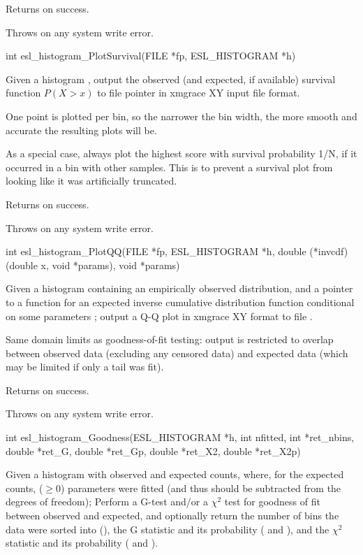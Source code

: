 \begin{sreapi}
Returns  on success.

Throws  on any system write error.


\hypertarget{func:esl_histogram_PlotSurvival()}
{\item[int esl\_histogram\_PlotSurvival(FILE *fp, ESL\_HISTOGRAM *h)]}

Given a histogram , output the observed (and
expected, if available) survival function $P(X>x)$
to file pointer  in xmgrace XY input file format.

One point is plotted per bin, so the narrower the
bin width, the more smooth and accurate the resulting
plots will be.

As a special case, always plot the highest score with
survival probability 1/N, if it occurred in a bin with
other samples. This is to prevent a survival plot from
looking like it was artificially truncated.

Returns  on success.

Throws  on any system write error.


\hypertarget{func:esl_histogram_PlotQQ()}
{\item[int esl\_histogram\_PlotQQ(FILE *fp, ESL\_HISTOGRAM *h, 
		     double (*invcdf)(double x, void *params), void *params)]}

Given a histogram  containing an empirically observed
distribution, and a pointer to a function 
for an expected inverse cumulative distribution
function conditional on some parameters ;
output a Q-Q plot in xmgrace XY format to file .

Same domain limits as goodness-of-fit testing: output
is restricted to overlap between observed data (excluding
any censored data) and expected data (which may be limited
if only a tail was fit).

Returns  on success.

Throws  on any system write error.


\hypertarget{func:esl_histogram_Goodness()}
{\item[int esl\_histogram\_Goodness(ESL\_HISTOGRAM *h, 
		       int nfitted, int *ret\_nbins,
		       double *ret\_G,  double *ret\_Gp,
		       double *ret\_X2, double *ret\_X2p)]}

Given a histogram  with observed and expected counts,
where, for the expected counts,  ($\geq 0$)
parameters were fitted (and thus should be subtracted
from the degrees of freedom);
Perform a G-test and/or a $\chi^2$ test for goodness of 
fit between observed and expected, and optionally return
the number of bins the data were sorted into
(), the G statistic and its probability ( and
), and the $\chi^2$ statistic and its probability
( and ). 


\end{sreapi}
